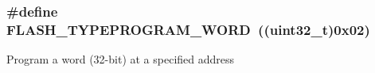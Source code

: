 \subsubsection[{\texorpdfstring{F\+L\+A\+S\+H\+\_\+\+T\+Y\+P\+E\+P\+R\+O\+G\+R\+A\+M\+\_\+\+W\+O\+RD}{FLASH_TYPEPROGRAM_WORD}}]{\setlength{\rightskip}{0pt plus 5cm}\#define F\+L\+A\+S\+H\+\_\+\+T\+Y\+P\+E\+P\+R\+O\+G\+R\+A\+M\+\_\+\+W\+O\+RD~((uint32\+\_\+t)0x02)}\hypertarget{group___f_l_a_s_h___type___program_gadd25c6821539030ba6711e7c0d586c3e}{}\label{group___f_l_a_s_h___type___program_gadd25c6821539030ba6711e7c0d586c3e}
Program a word (32-\/bit) at a specified address 